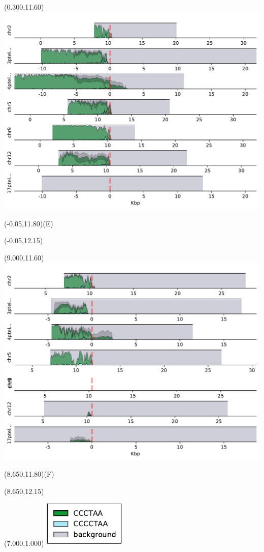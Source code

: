 \documentclass{article}
\begin{document}
\begin{textblock}{13}(0.300,11.60)\includegraphics{Figure_S2/HG006/densityplot-p_arm.pdf}\end{textblock}
\begin{textblock}{13}(-0.05,11.80)\LARGE{(E)}\end{textblock}
\begin{textblock}{13}(-0.05,12.15)\end{textblock}

\begin{textblock}{13}(9.000,11.60)\includegraphics{Figure_S2/HG007/densityplot-p_arm.pdf}\end{textblock}
\begin{textblock}{13}(8.650,11.80)\LARGE{(F)}\end{textblock}
\begin{textblock}{13}(8.650,12.15)\end{textblock}

\begin{textblock}{13}(7.000,1.000)\includegraphics[width=1.60in,keepaspectratio]{Figure_S2/densityplot-p_arm-legend.pdf}\end{textblock}
\end{document}
